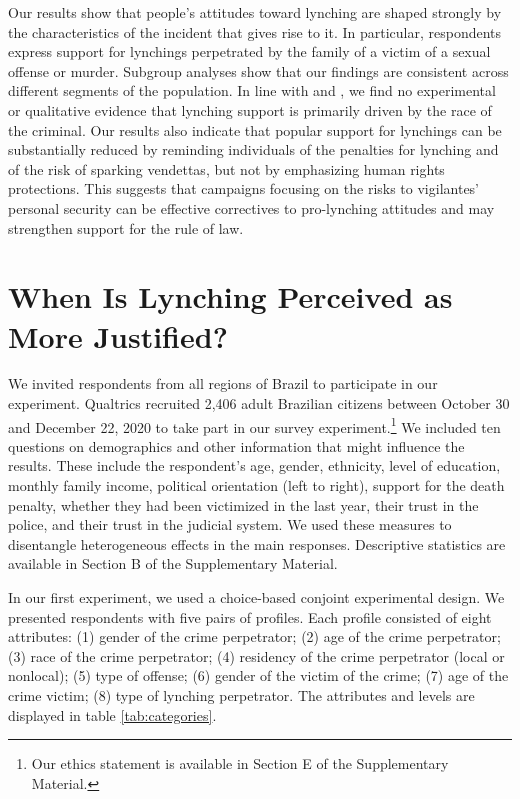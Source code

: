 \documentclass[12pt,a4paper]{article}
\begin{document}
Our results show that people's attitudes toward lynching are shaped strongly by
the characteristics of the incident that gives rise to it. In particular,
respondents express support for lynchings perpetrated by the family of a victim
of a sexual offense or murder. Subgroup analyses show that our findings are
consistent across different segments of the population. In line with
\citet{godoy2006popular} and \citet{martins2015linchamentos}, we find no
experimental or qualitative evidence that lynching support is primarily driven
by the race of the criminal. Our results also indicate that popular support for
lynchings can be substantially reduced by reminding individuals of the
penalties for lynching and of the risk of sparking vendettas, but not by
emphasizing human rights protections. This suggests that campaigns focusing on
the risks to vigilantes' personal security can be effective correctives to
pro-lynching attitudes and may strengthen support for the rule of law. 


\section*{When Is Lynching Perceived as More Justified?}
\label{sec:exp01}

We invited respondents from all regions of Brazil to participate in our
experiment. Qualtrics recruited 2,406 adult Brazilian citizens between October
30 and December 22, 2020 to take part in our survey experiment.\footnote{Our
ethics statement is available in Section E of the Supplementary Material.} We
included ten questions on demographics and other information that might
influence the results. These include the respondent's age, gender, ethnicity,
level of education, monthly family income, political orientation (left to
right), support for the death penalty, whether they had been victimized in the
last year, their trust in the police, and their trust in the judicial system.
We used these measures to disentangle heterogeneous effects in the main
responses. Descriptive statistics are available in Section B of the
Supplementary Material.

In our first experiment, we used a choice-based conjoint experimental design.
We presented respondents with five pairs of profiles. Each profile consisted of
eight attributes: (1) gender of the crime perpetrator; (2) age of the crime
perpetrator; (3) race of the crime perpetrator; (4) residency of the crime
perpetrator (local or nonlocal); (5) type of offense; (6) gender of the victim
of the crime; (7) age of the crime victim; (8) type of lynching perpetrator.
The attributes and levels are displayed in table \ref{tab:categories}.
\end{document}

